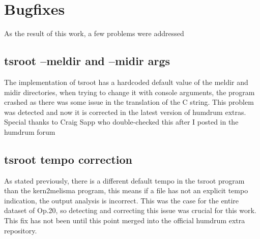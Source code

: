 	\section{Bugfixes}
  As the result of this work, a few problems were addressed
		\subsection{tsroot --meldir and --midir args}
    The implementation of tsroot has a hardcoded default value of the meldir and midir directories, when trying to change it with console arguments, the program crashed as there was some issue in the translation of the C string. This problem was detected and now it is corrected in the latest version of humdrum extras. Special thanks to Craig Sapp who double-checked this after I posted in the humdrum forum
		\subsection{tsroot tempo correction}
    As stated previously, there is a different default tempo in the tsroot program than the kern2melisma program, this means if a file has not an explicit tempo indication, the output analysis is incorrect. This was the case for the entire dataset of Op.20, so detecting and correcting this issue was crucial for this work. This fix has not been until this point merged into the official humdrum extra repository.
\newpage
